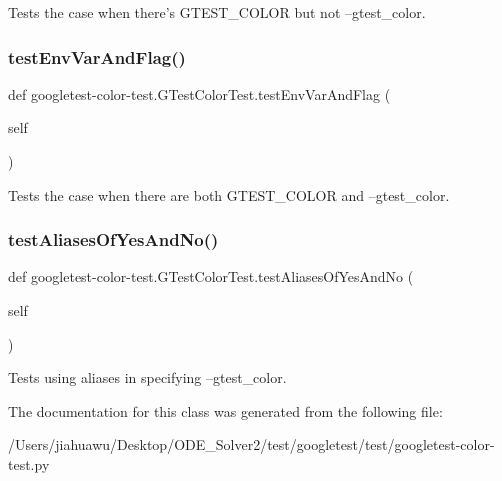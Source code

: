 \begin{DoxyVerb}Tests the case when there's GTEST_COLOR but not --gtest_color.\end{DoxyVerb}
 \mbox{\label{classgoogletest-color-test_1_1_g_test_color_test_a8f6cbbaa18feb66b8b03e6cc1f493f49}} 
\subsubsection{\texorpdfstring{test\+Env\+Var\+And\+Flag()}{testEnvVarAndFlag()}}
{\footnotesize\ttfamily def googletest-\/color-\/test.\+G\+Test\+Color\+Test.\+test\+Env\+Var\+And\+Flag (\begin{DoxyParamCaption}\item[{}]{self }\end{DoxyParamCaption})}

\begin{DoxyVerb}Tests the case when there are both GTEST_COLOR and --gtest_color.\end{DoxyVerb}
 \mbox{\label{classgoogletest-color-test_1_1_g_test_color_test_a82dd36b6a0fa82d417b7ec5e660c6e41}} 
\subsubsection{\texorpdfstring{test\+Aliases\+Of\+Yes\+And\+No()}{testAliasesOfYesAndNo()}}
{\footnotesize\ttfamily def googletest-\/color-\/test.\+G\+Test\+Color\+Test.\+test\+Aliases\+Of\+Yes\+And\+No (\begin{DoxyParamCaption}\item[{}]{self }\end{DoxyParamCaption})}

\begin{DoxyVerb}Tests using aliases in specifying --gtest_color.\end{DoxyVerb}
 

The documentation for this class was generated from the following file\+:\begin{DoxyCompactItemize}
\item 
/\+Users/jiahuawu/\+Desktop/\+O\+D\+E\+\_\+\+Solver2/test/googletest/test/googletest-\/color-\/test.\+py\end{DoxyCompactItemize}
